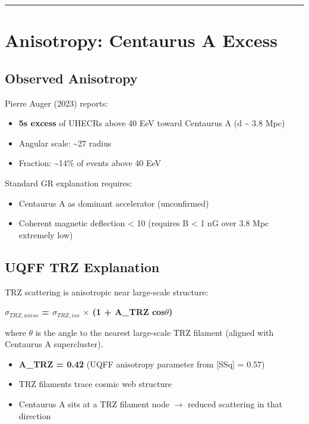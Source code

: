 \documentclass[12pt,a4paper]{article}
\begin{document}
\medskip\hrule\medskip

\section{Anisotropy: Centaurus A Excess}

\subsection{Observed Anisotropy}

Pierre Auger (2023) reports:

\begin{itemize}
  \item \textbf{5s excess} of UHECRs above 40 EeV toward Centaurus A (d \textasciitilde{} 3.8 Mpc)
  \item Angular scale: \textasciitilde{}27 radius
  \item Fraction: \textasciitilde{}14\% of events above 40 EeV
\end{itemize}

Standard GR explanation requires:

\begin{itemize}
  \item Centaurus A as dominant accelerator (unconfirmed)
  \item Coherent magnetic deflection < 10 (requires B < 1 nG over 3.8 Mpc  extremely low)
\end{itemize}

\subsection{UQFF TRZ Explanation}

TRZ scattering is anisotropic near large-scale structure:

\textbf{$\sigma_{TRZ,aniso}$ = $\sigma_{TRZ,iso}$ $\times$ (1 + A\_TRZ cos$\theta$)}

where $\theta$ is the angle to the nearest large-scale TRZ filament (aligned with Centaurus A supercluster).

\begin{itemize}
  \item \textbf{A\_TRZ = 0.42} (UQFF anisotropy parameter from [SSq] = 0.57)
  \item TRZ filaments trace cosmic web structure
  \item Centaurus A sits at a TRZ filament node $\rightarrow$ reduced scattering in that direction
\end{itemize}
\end{document}
